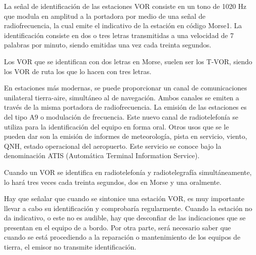 La señal de identificación de las estaciones VOR consiste en un tono de 1020 Hz que modula en amplitud a la portadora por medio de una señal de radiofrecuencia, la cual emite el indicativo de la estación en código Morse1. La identificación consiste en dos o tres letras transmitidas a una velocidad de 7 palabras por minuto, siendo emitidas una vez cada treinta segundos.

Los VOR que se identifican con dos letras en Morse, suelen ser los T-VOR, siendo los VOR de ruta los que lo hacen con tres letras.

En estaciones más modernas, se puede proporcionar un canal de comunicaciones unilateral tierra-aire, simultáneo al de navegación. Ambos canales se emiten a través de la misma portadora de radiofrecuencia. La emisión de las estaciones es del tipo A9 o modulación de frecuencia. Este nuevo canal de radiotelefonía se utiliza para la identificación del equipo en forma oral. Otros usos que se le pueden dar son la emisión de informes de meteorología, pista en servicio, viento, QNH, estado operacional del aeropuerto. Este servicio se conoce bajo la denominación ATIS (Automática Terminal Information Service).

Cuando un VOR se identifica en radiotelefonía y radiotelegrafía simultáneamente, lo hará tres veces cada treinta segundos, dos en Morse y una oralmente.

Hay que señalar que cuando se sintonice una estación VOR, es muy importante llevar a cabo su identificación y comprobaría regularmente. Cuando la estación no da indicativo, o este no es audible, hay que desconfiar de las indicaciones que se presentan en el equipo de a bordo. Por otra parte, será necesario saber que cuando se está procediendo a la reparación o mantenimiento de los equipos de tierra, el emisor no transmite identificación.
